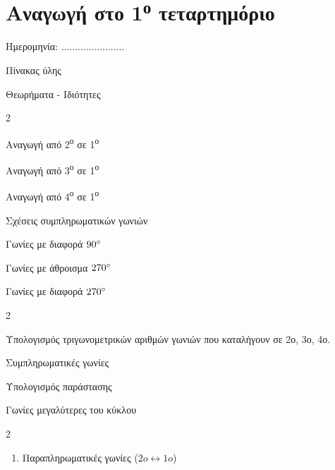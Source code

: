 \documentclass[twoside,nofonts,internet,math,spyros]{frontisthrio}
\newcommand{\tss}[1]{\textsuperscript{#1}}
\newcommand{\myitem}{\stepcounter{enumi}\item[\raisebox{0.5mm}{\faEdit}\ \Large$\square$]}
\begin{document}
\newpage
\section{Αναγωγή στο 1\tss{ο} τεταρτημόριο}
\begin{flushright}
\faCalendar* Ημερομηνία: .......................
\end{flushright}
\begin{mybox}[mysubtitle]{Πίνακας ύλης}
\begin{tcbraster}[raster columns=1,raster equal height]
\begin{myleftbox}{Θεωρήματα - Ιδιότητες\ \ \faTools}
\begin{multicols}{2}
\begin{arithmisi}[itemsep=0mm]
\item Αναγωγή από 2\tss{ο} σε 1\tss{ο}
\item Αναγωγή από 3\tss{ο} σε 1\tss{ο}
\item Αναγωγή από 4\tss{ο} σε 1\tss{ο}
\item Σχέσεις συμπληρωματικών γωνιών
\item Γωνίες με διαφορά $ 90\degree $
\item Γωνίες με άθροισμα $ 270\degree $
\item Γωνίες με διαφορά $ 270\degree $
\end{arithmisi}
\end{multicols}
\end{myleftbox}
\end{tcbraster}
\begin{multicols}{2}
\begin{todolist}[itemsep=0mm]
\myitem Υπολογισμός τριγωνομετρικών αριθμών γωνιών που καταλήγουν σε 2ο, 3ο, 4ο.
\item Συμπληρωματικές γωνίες
\item Υπολογισμός παράστασης
\item Γωνίες μεγαλύτερες του κύκλου
\end{todolist}
\end{multicols}
\begin{multicols}{2}
\begin{enumerate}[itemsep=0mm]
\item Παραπληρωματικές γωνίες ($ 2o \leftrightarrow 1o $)
\begin{alist}
\item $ \hm{(180\degree-\omega)}=\hm{\omega} $
\item $ \syn{(180\degree-\omega)}=-\syn{\omega} $

\end{alist}
\end{enumerate}
\end{multicols}
\end{mybox}
\end{document}
